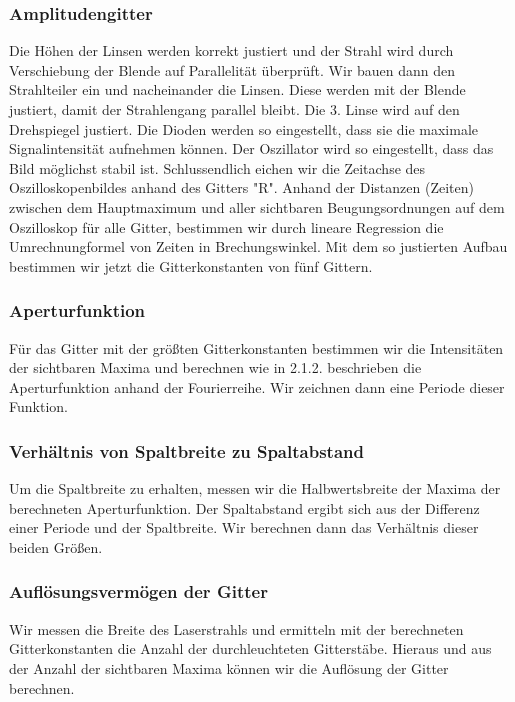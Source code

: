 \subsubsection{Amplitudengitter}

Die H\"ohen der Linsen werden korrekt justiert und der Strahl wird durch Verschiebung der Blende auf Parallelit\"at \"uberpr\"uft. Wir bauen dann den Strahlteiler ein und nacheinander die Linsen. Diese werden mit der Blende justiert, damit der Strahlengang parallel bleibt. Die 3. Linse wird auf den Drehspiegel justiert. Die Dioden werden so eingestellt, dass sie die maximale Signalintensit\"at aufnehmen k\"onnen. Der Oszillator wird so eingestellt, dass das Bild m\"oglichst stabil ist. Schlussendlich eichen wir die Zeitachse des Oszilloskopenbildes anhand des Gitters "R". Anhand der Distanzen (Zeiten) zwischen dem Hauptmaximum und aller sichtbaren Beugungsordnungen auf dem Oszilloskop f\"ur alle Gitter, bestimmen wir durch lineare Regression die Umrechnungformel von Zeiten in Brechungswinkel.
Mit dem so justierten Aufbau bestimmen wir jetzt die Gitterkonstanten von fünf Gittern.

\subsubsection{Aperturfunktion}
Für das Gitter mit der größten Gitterkonstanten bestimmen wir die Intensitäten der sichtbaren Maxima und berechnen wie in 2.1.2. beschrieben die Aperturfunktion anhand der Fourierreihe. Wir zeichnen dann eine Periode dieser Funktion.

\subsubsection{Verh\"altnis von Spaltbreite zu Spaltabstand}

Um die Spaltbreite zu erhalten, messen wir die Halbwertsbreite der Maxima der berechneten Aperturfunktion. Der Spaltabstand ergibt sich aus der Differenz einer Periode und der Spaltbreite. Wir berechnen dann das Verh\"altnis dieser beiden Gr\"o\ss en.

\subsubsection{Aufl\"osungsverm\"ogen der Gitter}

Wir messen die Breite des Laserstrahls und ermitteln mit der berechneten Gitterkonstanten die Anzahl der durchleuchteten Gitterst\"abe. Hieraus und aus der Anzahl der sichtbaren Maxima k\"onnen wir die Aufl\"osung der Gitter berechnen.



